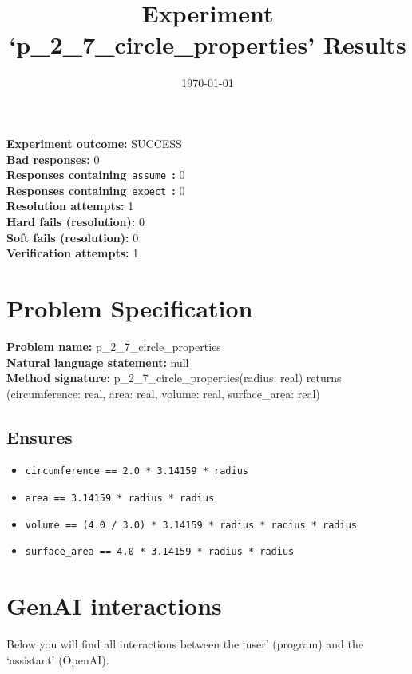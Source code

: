 \documentclass{article}
\begin{document}
\title{Experiment `p\_2\_7\_circle\_properties' Results}
\author{\today}
\date{}
\maketitle
\textbf{Experiment outcome: }SUCCESS
\\\textbf{Bad responses: }0
\\\textbf{Responses containing}~\texttt{assume}~\textbf{: }0
\\\textbf{Responses containing}~\texttt{expect}~\textbf{: }0
\\\textbf{Resolution attempts: }1
\\\textbf{Hard fails (resolution): }0
\\\textbf{Soft fails (resolution): }0
\\\textbf{Verification attempts: }1
\section*{Problem Specification}
\textbf{Problem name: }p\_2\_7\_circle\_properties
\\\textbf{Natural language statement: }null
\\\textbf{Method signature: }p\_2\_7\_circle\_properties(radius: real) returns (circumference: real, area: real, volume: real, surface\_area: real)
\subsection*{Ensures}
\begin{itemize}
\item \texttt{circumference == 2.0 * 3.14159 * radius}
\item \texttt{area == 3.14159 * radius * radius}
\item \texttt{volume == (4.0 / 3.0) * 3.14159 * radius * radius * radius}
\item \texttt{surface\_area == 4.0 * 3.14159 * radius * radius}
\end{itemize}
\clearpage
\section*{GenAI interactions}
Below you will find all interactions between the `user' (program) and the `assistant' (OpenAI).
\end{document}
